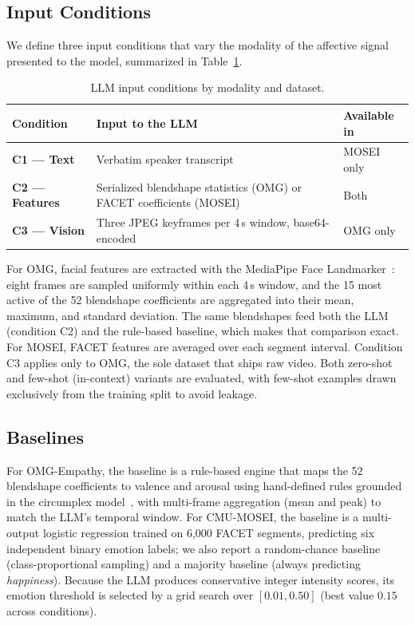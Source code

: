 \documentclass[conference]{IEEEtran}
\begin{document}
\subsection{Input Conditions}
We define three input conditions that vary the modality of the affective signal presented to the model, summarized in Table~\ref{tab:conditions}.

\begin{table}[htbp]
\caption{LLM input conditions by modality and dataset.}
\label{tab:conditions}
\centering
\setlength{\tabcolsep}{4pt}
\renewcommand{\arraystretch}{1.15}
\small
\begin{tabular}{l p{3.6cm} l}
\hline
\textbf{Condition} & \textbf{Input to the LLM} & \textbf{Available in} \\
\hline
\textbf{C1 --- Text} & Verbatim speaker transcript & MOSEI only \\
\textbf{C2 --- Features} & Serialized blendshape statistics (OMG) or FACET coefficients (MOSEI) & Both \\
\textbf{C3 --- Vision} & Three JPEG keyframes per 4\,s window, base64-encoded & OMG only \\
\hline
\end{tabular}
\end{table}

For OMG, facial features are extracted with the MediaPipe Face Landmarker~\cite{Surdulescu2023Blendshapes}: eight frames are sampled uniformly within each 4\,s window, and the 15 most active of the 52 blendshape coefficients are aggregated into their mean, maximum, and standard deviation. The same blendshapes feed both the LLM (condition C2) and the rule-based baseline, which makes that comparison exact. For MOSEI, FACET features are averaged over each segment interval. Condition C3 applies only to OMG, the sole dataset that ships raw video. Both zero-shot and few-shot (in-context) variants are evaluated, with few-shot examples drawn exclusively from the training split to avoid leakage.

\subsection{Baselines}
For OMG-Empathy, the baseline is a rule-based engine that maps the 52 blendshape coefficients to valence and arousal using hand-defined rules grounded in the circumplex model~\cite{Russell1980Circumplex}, with multi-frame aggregation (mean and peak) to match the LLM's temporal window. For CMU-MOSEI, the baseline is a multi-output logistic regression trained on 6{,}000 FACET segments, predicting six independent binary emotion labels; we also report a random-chance baseline (class-proportional sampling) and a majority baseline (always predicting \emph{happiness}). Because the LLM produces conservative integer intensity scores, its emotion threshold is selected by a grid search over $[0.01, 0.50]$ (best value $0.15$ across conditions).
\end{document}
